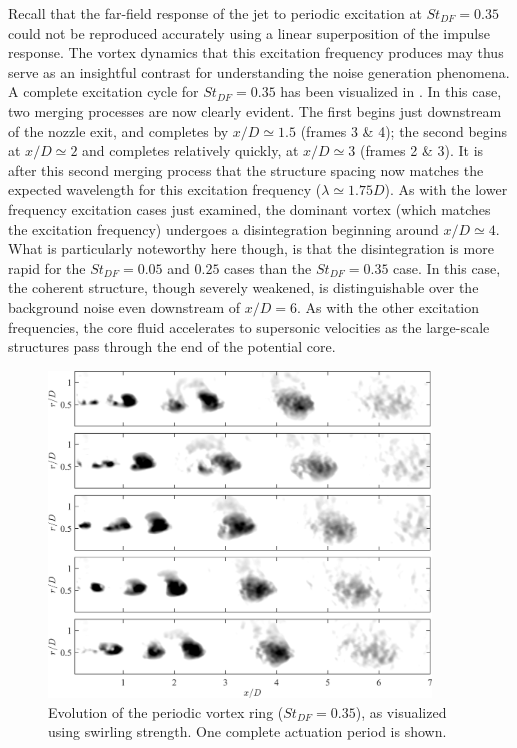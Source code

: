 Recall that the far-field response of the jet to periodic excitation at $St_{DF}=0.35$ could not be reproduced accurately using a linear superposition of the impulse response.
The vortex dynamics that this excitation frequency produces may thus serve as an insightful contrast for understanding the noise generation phenomena.
A complete excitation cycle for $St_{DF}=0.35$ has been visualized in .
In this case, two merging processes are now clearly evident.
The first begins just downstream of the nozzle exit, and completes by $x/D \simeq 1.5$ (frames 3 \& 4); the second begins at $x/D \simeq 2$ and completes relatively quickly, at $x/D \simeq 3$ (frames 2 \& 3).
It is after this second merging process that the structure spacing now matches the expected wavelength for this excitation frequency ($\lambda \simeq 1.75D$).
As with the lower frequency excitation cases just examined, the dominant vortex (which matches the excitation frequency) undergoes a disintegration beginning around $x/D \simeq 4$.
What is particularly noteworthy here though, is that the disintegration is more rapid for the $St_{DF}=0.05$ and $0.25$ cases than the $St_{DF}=0.35$ case.
In this case, the coherent structure, though severely weakened, is distinguishable over the background noise even downstream of $x/D = 6$.
As with the other excitation frequencies, the core fluid accelerates to supersonic velocities as the large-scale structures pass through the end of the potential core.
\begin{figure}
	\centering
	\includegraphics[width=4in]{Figures/ch4_St035_lambda_evolution.png}
	\caption{Evolution of the periodic vortex ring ($St_{DF}=0.35$), as visualized using swirling strength. One complete actuation period is shown.}
	\label{fig:ch4_St035_structure_disintegration}
\end{figure}

